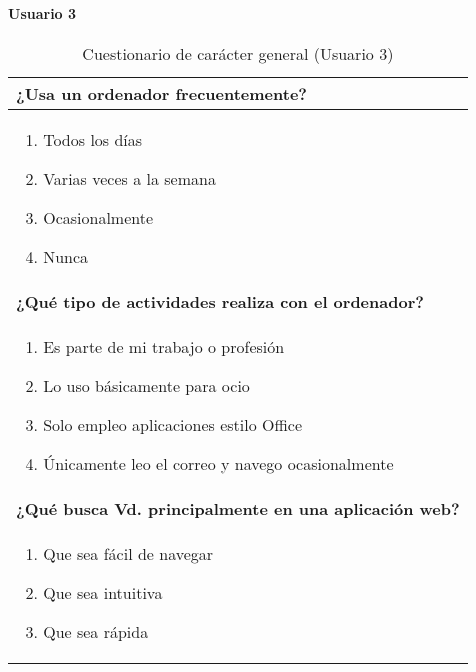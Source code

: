 \paragraph*{Usuario 3}
\begin{table}[H]
\centering
\caption{Cuestionario de carácter general (Usuario 3)}
\begin{tabular}{p{36em}}
\toprule
\rowcolor[rgb]{ .949,  .949,  .949} \textbf{¿Usa un ordenador frecuentemente?} \\ \midrule
\vspace{-4mm}
\begin{enumerate}
\item Todos los días
\item Varias veces a la semana
\item Ocasionalmente
\item Nunca
\end{enumerate} \\ \midrule
\rowcolor[rgb]{ .949,  .949,  .949} \textbf{¿Qué tipo de actividades realiza con el ordenador?} \\ \midrule
\vspace{-4mm}
\begin{enumerate}
\item Es parte de mi trabajo o profesión
\item Lo uso básicamente para ocio
\item Solo empleo aplicaciones estilo Office
\item Únicamente leo el correo y navego ocasionalmente
\end{enumerate} \\ \midrule
\rowcolor[rgb]{ .949,  .949,  .949} \textbf{¿Qué busca Vd. principalmente en una aplicación web?} \\ \midrule
\vspace{-4mm}
\begin{enumerate}
\item Que sea fácil de navegar
\item Que sea intuitiva
\item Que sea rápida
\end{enumerate} \\ \bottomrule
\end{tabular}
\end{table}

